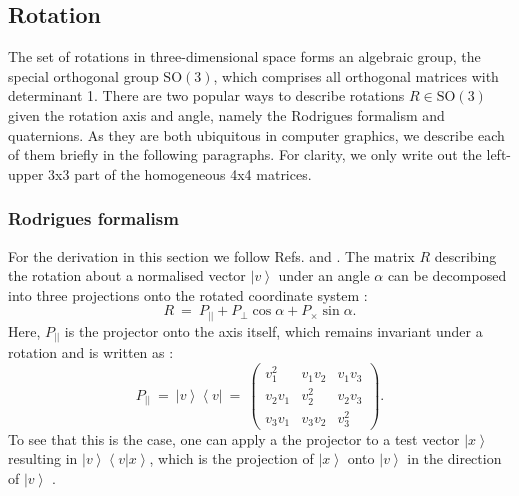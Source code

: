 \subsection{Rotation}
The set of rotations in three-dimensional space forms an algebraic group, the special orthogonal group $\mathrm{SO\left(3\right)}$,
which comprises all orthogonal matrices with determinant 1.
There are two popular ways to describe rotations $R \in \mathrm{SO\left(3\right)}$ given the rotation axis and angle, 
namely the Rodrigues formalism and quaternions. 
As they are both ubiquitous in computer graphics, we describe each of them briefly in the following paragraphs.
For clarity, we only write out the left-upper 3x3 part of the homogeneous 4x4 matrices.

\subsubsection{Rodrigues formalism}
For the derivation in this section we follow Refs. \cite[p. 718, p. 816]{Arens2015} and \cite{wiki_rodrigues}.
The matrix $R$ describing the rotation about a normalised vector $\left|v\right>$ under an angle $\alpha$ can be decomposed into
three projections onto the rotated coordinate system \cite[p. 718, p. 816]{Arens2015}:
\begin{equation}
	\boxed{R \ = \ P_{||} + P_{\perp} \cos \alpha + P_{\times} \sin \alpha.}
	\label{eq:rodrigues}
\end{equation}
Here, $P_{||}$ is the projector onto the axis itself, which remains invariant under a rotation and is written as \cite[p. 814]{Arens2015}:
\begin{equation}
	P_{||} \ =\ \left|v\right> \left<v\right| \ =\ 
		\left( \begin{array}{ccc} 
			v_1^2    &    v_1 v_2 &       v_1 v_3 \\
			v_2 v_1 &       v_2^2 &       v_2 v_3 \\
			v_3 v_1 &    v_3 v_2 &          v_3^2
		\end{array} \right).
\end{equation}
To see that this is the case, one can apply a the projector to a test vector $\left| x \right>$ resulting in $\left|v\right> \left<v | x \right>$,
which is the projection of $\left| x \right>$ onto $\left| v \right>$ in the direction of $\left| v \right>$ \cite[p. 814]{Arens2015}.

